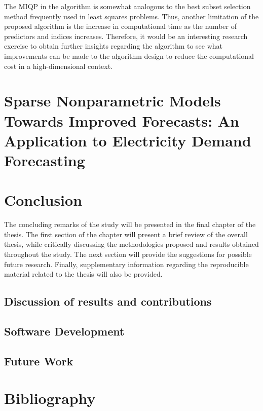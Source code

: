\documentclass[
  11pt,
  a4paper,
]{report}
\newlength{\cslhangindent}
\newenvironment{CSLReferences}[2] %
 {\begin{list}{}{%
  \setlength{\itemindent}{0pt}
  \setlength{\leftmargin}{0pt}
  \setlength{\parsep}{0pt}
  \ifodd #1
   \setlength{\leftmargin}{\cslhangindent}
   \setlength{\itemindent}{-1\cslhangindent}
  \fi
  \setlength{\itemsep}{#2\baselineskip}}}
 {\end{list}}
\begin{document}
The MIQP in the algorithm is somewhat analogous to the best subset
selection method frequently used in least squares problems. Thus,
another limitation of the proposed algorithm is the increase in
computational time as the number of predictors and indices increases.
Therefore, it would be an interesting research exercise to obtain
further insights regarding the algorithm to see what improvements can be
made to the algorithm design to reduce the computational cost in a
high-dimensional context.


\chapter{}\label{section-1}


\chapter{Sparse Nonparametric Models Towards Improved Forecasts: An
Application to Electricity Demand Forecasting}\label{sec-Elec}


\chapter{Conclusion}\label{sec-conclusion}

The concluding remarks of the study will be presented in the final
chapter of the thesis. The first section of the chapter will present a
brief review of the overall thesis, while critically discussing the
methodologies proposed and results obtained throughout the study. The
next section will provide the suggestions for possible future research.
Finally, supplementary information regarding the reproducible material
related to the thesis will also be provided.

\section{Discussion of results and
contributions}\label{sec-contribution}

\section{Software Development}\label{sec-software}

\section{Future Work}\label{sec-future}


\chapter*{Bibliography}\label{bibliography}


\label{refs}
\begin{CSLReferences}{0}{1}
\end{CSLReferences}
\end{document}
